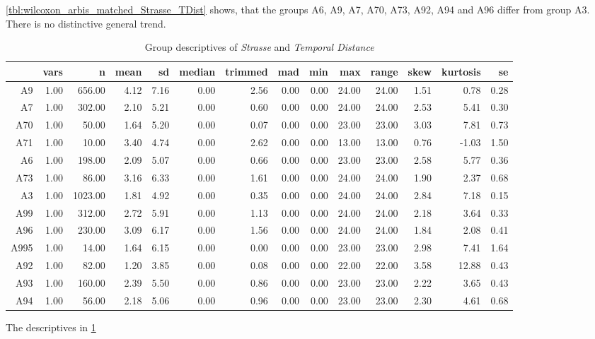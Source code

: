 \cref{tbl:wilcoxon_arbis_matched_Strasse_TDist} shows, that the groups A6, A9, A7, A70, A73, A92, A94 and A96 differ from group A3. There is no distinctive general trend.
\begin{table}[ht!]
	\tiny
	\centering
	\begin{tabular}{rrrrrrrrrrrrrr}
		\hline
		& vars & n & mean & sd & median & trimmed & mad & min & max & range & skew & kurtosis & se \\ 
		\hline
		A9   & 1.00 & 656.00 & 4.12 & 7.16 & 0.00 & 2.56 & 0.00 & 0.00 & 24.00 & 24.00 & 1.51 & 0.78 & 0.28 \\ 
		A7   & 1.00 & 302.00 & 2.10 & 5.21 & 0.00 & 0.60 & 0.00 & 0.00 & 24.00 & 24.00 & 2.53 & 5.41 & 0.30 \\ 
		A70  & 1.00 & 50.00 & 1.64 & 5.20 & 0.00 & 0.07 & 0.00 & 0.00 & 23.00 & 23.00 & 3.03 & 7.81 & 0.73 \\ 
		A71  & 1.00 & 10.00 & 3.40 & 4.74 & 0.00 & 2.62 & 0.00 & 0.00 & 13.00 & 13.00 & 0.76 & -1.03 & 1.50 \\ 
		A6   & 1.00 & 198.00 & 2.09 & 5.07 & 0.00 & 0.66 & 0.00 & 0.00 & 23.00 & 23.00 & 2.58 & 5.77 & 0.36 \\ 
		A73  & 1.00 & 86.00 & 3.16 & 6.33 & 0.00 & 1.61 & 0.00 & 0.00 & 24.00 & 24.00 & 1.90 & 2.37 & 0.68 \\ 
		A3   & 1.00 & 1023.00 & 1.81 & 4.92 & 0.00 & 0.35 & 0.00 & 0.00 & 24.00 & 24.00 & 2.84 & 7.18 & 0.15 \\ 
		A99  & 1.00 & 312.00 & 2.72 & 5.91 & 0.00 & 1.13 & 0.00 & 0.00 & 24.00 & 24.00 & 2.18 & 3.64 & 0.33 \\ 
		A96  & 1.00 & 230.00 & 3.09 & 6.17 & 0.00 & 1.56 & 0.00 & 0.00 & 24.00 & 24.00 & 1.84 & 2.08 & 0.41 \\ 
		A995 & 1.00 & 14.00 & 1.64 & 6.15 & 0.00 & 0.00 & 0.00 & 0.00 & 23.00 & 23.00 & 2.98 & 7.41 & 1.64 \\ 
		A92  & 1.00 & 82.00 & 1.20 & 3.85 & 0.00 & 0.08 & 0.00 & 0.00 & 22.00 & 22.00 & 3.58 & 12.88 & 0.43 \\ 
		A93  & 1.00 & 160.00 & 2.39 & 5.50 & 0.00 & 0.86 & 0.00 & 0.00 & 23.00 & 23.00 & 2.22 & 3.65 & 0.43 \\ 
		A94  & 1.00 & 56.00 & 2.18 & 5.06 & 0.00 & 0.96 & 0.00 & 0.00 & 23.00 & 23.00 & 2.30 & 4.61 & 0.68 \\ 
		\bottomrule
	\end{tabular}
	\caption{Group descriptives of \textit{Strasse} and \textit{Temporal Distance}}
	\label{tbl:descriptives_arbis_matched_Strasse_TDist}
\end{table}
The descriptives in \cref{tbl:descriptives_arbis_matched_Strasse_TDist}


